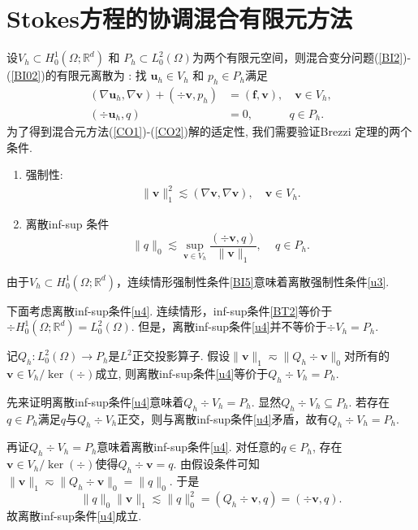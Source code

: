 \section{Stokes方程的协调混合有限元方法}
设$ V_h \subset H_0^{1}(\Omega; \mathbb{R}^{d})$ 和 $P_h \subset  L_{0}^{2}(\Omega)$为两个有限元空间，则混合变分问题(\ref{BI2})-(\ref{BI02})的有限元离散为 : 找 $\boldsymbol{u}_h \in  V_h$ 和 $p_h \in P_h$满足
\begin{align}
(\nabla\boldsymbol{u}_h,\nabla\boldsymbol{v}) + (\div\boldsymbol{v},p_h) &=(\boldsymbol{f},\boldsymbol{v}),\quad \boldsymbol{v}\in   V_h,\label{CO1}\\
(\div\boldsymbol{u}_h,q) &=0, \quad\quad\quad\, q\in P_h.\label{CO2}
\end{align}
为了得到混合元方法(\ref{CO1})-(\ref{CO2})解的适定性, 我们需要验证Brezzi 定理的两个条件.
\begin{enumerate}[label=(\alph*)]
\item 强制性:
\begin{align}\label{u3}
\|\boldsymbol{v}\|^{2}_{1}
\lesssim (\nabla\boldsymbol{v},\nabla\boldsymbol{v}),\quad \boldsymbol{v}\in  V_h.\end{align}
\item 离散inf-sup 条件
\begin{equation}\label{u4}
\|q\|_{0}\lesssim\sup _{\boldsymbol{v} \in  V_h}
\frac{(\div\boldsymbol{v}, q)}{\|\boldsymbol{v}\|_{1}},\quad\, q\in P_h.
\end{equation}
\end{enumerate}

由于$ V_h \subset H_0^{1}(\Omega; \mathbb{R}^{d})$，连续情形强制性条件\eqref{BI5}意味着离散强制性条件\eqref{u3}.

下面考虑离散inf-sup条件\eqref{u4}. 连续情形，inf-sup条件\eqref{BT2}等价于$\div H_0^{1}(\Omega; \mathbb{R}^{d})=L_{0}^{2}(\Omega)$. 但是，离散inf-sup条件\eqref{u4}并不等价于$\div V_h=P_h$.

\begin{lemma}
记$Q_h :L_0^{2}(\Omega)\rightarrow  P_h$是$L^2$正交投影算子.
假设$\|\boldsymbol{v}\|_1\eqsim \|Q_h\div\boldsymbol{v}\|_0$对所有的$\boldsymbol{v}\in V_h/\ker(\div)$成立, 则离散inf-sup条件\eqref{u4}等价于$Q_h\div V_h=P_h$.
\end{lemma}
\begin{prf}
先来证明离散inf-sup条件\eqref{u4}意味着$Q_h\div V_h=P_h$. 显然$Q_h\div V_h\subseteq P_h$. 若存在$q\in P_h$满足$q$与$Q_h\div V_h$正交，则与离散inf-sup条件\eqref{u4}矛盾，故有$Q_h\div V_h=P_h$.

再证$Q_h\div V_h=P_h$意味着离散inf-sup条件\eqref{u4}. 对任意的$q\in P_h$, 存在$\boldsymbol{v}\in V_h/\ker(\div)$使得$Q_h\div\boldsymbol{v}=q$. 由假设条件可知$\|\boldsymbol{v}\|_1\eqsim \|Q_h\div\boldsymbol{v}\|_0=\|q\|_0$. 于是
\begin{equation*}
\|q\|_0\|\boldsymbol{v}\|_1\lesssim \|q\|_0^2=(Q_h\div\boldsymbol{v}, q)=(\div\boldsymbol{v}, q).
\end{equation*}
故离散inf-sup条件\eqref{u4}成立.
\end{prf}

